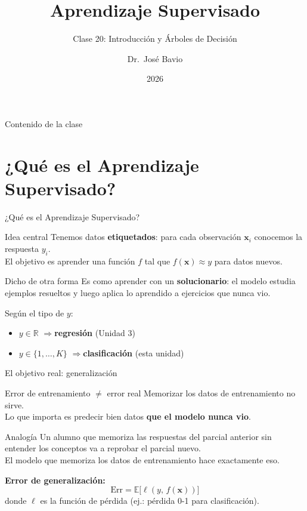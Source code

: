 \documentclass[aspectratio=169]{beamer}
\title[MAD1 -- Unidad 4]{Aprendizaje Supervisado}
\subtitle{Clase 20: Introducción y Árboles de Decisión}
\author[J. Bavio]{Dr.\ José Bavio}
\institute[UNS]{Departamento de Matemática\\Universidad Nacional del Sur}
\date{2026}
\newcommand{\R}{\mathbb{R}}
\newcommand{\bx}{\bm{x}}
\newcommand{\E}{\mathbb{E}}
\begin{document}

\begin{frame}
  \titlepage
\end{frame}

\begin{frame}{Contenido de la clase}
  \tableofcontents
\end{frame}

\section{¿Qué es el Aprendizaje Supervisado?}

\begin{frame}{¿Qué es el Aprendizaje Supervisado?}
  \begin{block}{Idea central}
    Tenemos datos \textbf{etiquetados}: para cada observación $\bx_i$ conocemos la respuesta $y_i$.\\
    El objetivo es aprender una función $f$ tal que $f(\bx) \approx y$ para datos nuevos.
  \end{block}

  \medskip
  \begin{exampleblock}{Dicho de otra forma}
    Es como aprender con un \textbf{solucionario}: el modelo estudia ejemplos resueltos
    y luego aplica lo aprendido a ejercicios que nunca vio.
  \end{exampleblock}

  \medskip
  Según el tipo de $y$:
  \begin{itemize}
    \item $y \in \R$ \quad$\Rightarrow$\quad \textbf{regresión} (Unidad 3)
    \item $y \in \{1, \ldots, K\}$ \quad$\Rightarrow$\quad \textbf{clasificación} (esta unidad)
  \end{itemize}
\end{frame}

\begin{frame}{El objetivo real: generalización}
  \begin{alertblock}{Error de entrenamiento $\neq$ error real}
    Memorizar los datos de entrenamiento no sirve.\\
    Lo que importa es predecir bien datos \textbf{que el modelo nunca vio}.
  \end{alertblock}

  \medskip
  \begin{exampleblock}{Analogía}
    Un alumno que memoriza las respuestas del parcial anterior sin entender
    los conceptos va a reprobar el parcial nuevo.\\
    El modelo que memoriza los datos de entrenamiento hace exactamente eso.
  \end{exampleblock}

  \medskip
  \textbf{Error de generalización:}
  \[
    \text{Err} = \E\bigl[\ell(y,\, f(\bx))\bigr]
  \]
  donde $\ell$ es la función de pérdida (ej.: pérdida 0-1 para clasificación).
\end{frame}
\end{document}
